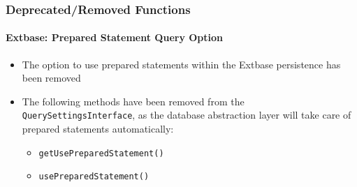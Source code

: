 \begin{frame}[fragile]
	\frametitle{Deprecated/Removed Functions}
	\framesubtitle{Extbase: Prepared Statement Query Option}

	\begin{itemize}

		\item The option to use prepared statements within the Extbase persistence has been removed

		\item The following methods have been removed from the \texttt{QuerySettingsInterface},
			as the database abstraction layer will take care of prepared statements automatically:

			\begin{itemize}
				\item \texttt{getUsePreparedStatement()}
				\item \texttt{usePreparedStatement()}
			\end{itemize}

	\end{itemize}

\end{frame}

